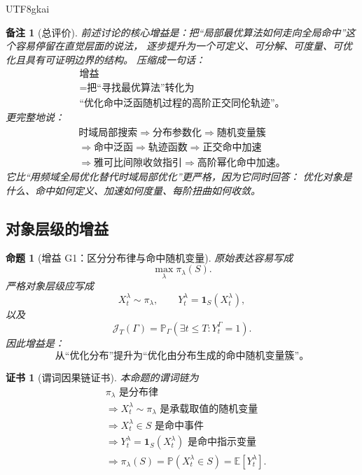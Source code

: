\documentclass[12pt]{article}
\newtheorem{proposition}{命题}[section]
\newtheorem{remark}{备注}[section]
\newtheorem{Certificate}{证书}[section]
\begin{document}
\begin{CJK*}{UTF8}{gkai}
\begin{remark}[总评价]
前述讨论的核心增益是：把“局部最优算法如何走向全局命中”这个容易停留在直觉层面的说法，
逐步提升为一个可定义、可分解、可度量、可优化且具有可证明边界的结构。
压缩成一句话：
\[
  \boxed{
  \begin{gathered}
  \text{增益}\\
  =
  \text{把“寻找最优算法”转化为}\\
  \text{“优化命中泛函随机过程的高阶正交同伦轨迹”。}
  \end{gathered}
  }
\]
更完整地说：
\[
  \boxed{
  \begin{gathered}
  \text{时域局部搜索}
  \Longrightarrow
  \text{分布参数化}
  \Longrightarrow
  \text{随机变量簇}\\
  \Longrightarrow
  \text{命中泛函}
  \Longrightarrow
  \text{轨迹函数}
  \Longrightarrow
  \text{正交命中加速}\\
  \Longrightarrow
  \text{雅可比间隙收敛指引}
  \Longrightarrow
  \text{高阶幂化命中加速。}
  \end{gathered}
  }
\]
它比“用频域全局优化替代时域局部优化”更严格，因为它同时回答：
优化对象是什么、命中如何定义、加速如何度量、每阶扭曲如何收敛。
\end{remark}

\subsection{对象层级的增益}
\label{subsec:tex55-gain-object-level}

\begin{proposition}[增益 G1：区分分布律与命中随机变量]
\label{prop:tex55-gain-distribution-rv}
原始表达容易写成
\[
  \max_{\lambda}\pi_\lambda(S).
\]
严格对象层级应写成
\[
  X_t^\lambda\sim\pi_\lambda,
  \qquad
  Y_t^\lambda=\mathbf 1_S(X_t^\lambda),
\]
以及
\[
  \mathcal J_T(\Gamma)
  =
  \mathbb P_\Gamma(\exists t\le T:Y_t^\Gamma=1).
\]
因此增益是：
\[
  \boxed{
  \text{从“优化分布”提升为“优化由分布生成的命中随机变量簇”。}
  }
\]
\end{proposition}

\begin{Certificate}[谓词因果链证书]
\label{cert:tex55-gain-distribution-rv}
本命题的谓词链为
\[
\begin{aligned}
  &\pi_\lambda
  \text{ 是分布律}\\
  &\Longrightarrow
  X_t^\lambda\sim\pi_\lambda
  \text{ 是承载取值的随机变量}\\
  &\Longrightarrow
  X_t^\lambda\in S
  \text{ 是命中事件}\\
  &\Longrightarrow
  Y_t^\lambda=\mathbf 1_S(X_t^\lambda)
  \text{ 是命中指示变量}\\
  &\Longrightarrow
  \pi_\lambda(S)=\mathbb P(X_t^\lambda\in S)
  =
  \mathbb E[Y_t^\lambda].
\end{aligned}
\]
\end{Certificate}


\end{CJK*}
\end{document}
